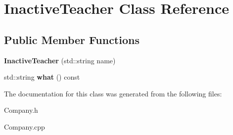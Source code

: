 \hypertarget{class_inactive_teacher}{}\section{Inactive\+Teacher Class Reference}
\label{class_inactive_teacher}
\subsection*{Public Member Functions}
\begin{DoxyCompactItemize}
\item 
\mbox{\label{class_inactive_teacher_af3b09b6cd0eb7865e5258ce5b436bccc}} 
{\bfseries Inactive\+Teacher} (std\+::string name)
\item 
\mbox{\label{class_inactive_teacher_a86daeb5ff2ac47d16ad5460ac17ef001}} 
std\+::string {\bfseries what} () const
\end{DoxyCompactItemize}


The documentation for this class was generated from the following files\+:\begin{DoxyCompactItemize}
\item 
Company.\+h\item 
Company.\+cpp\end{DoxyCompactItemize}
